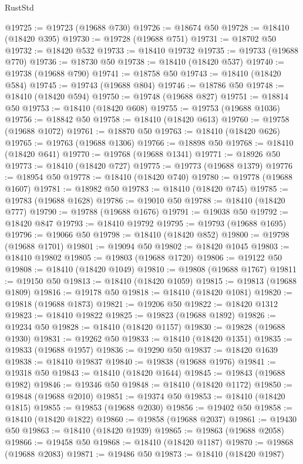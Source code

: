 \begin{lexlean}{RustStd}
\begin{coremodule}
@19725 := @19723 (@19688 @730)
@19726 := @18674 @50
@19728 := @18410 (@18420 @395)
@19730 := @19728 (@19688 @751)
@19731 := @18702 @50
@19732 := @18420 @532
@19733 := @18410 @19732
@19735 := @19733 (@19688 @770)
@19736 := @18730 @50
@19738 := @18410 (@18420 @537)
@19740 := @19738 (@19688 @790)
@19741 := @18758 @50
@19743 := @18410 (@18420 @584)
@19745 := @19743 (@19688 @804)
@19746 := @18786 @50
@19748 := @18410 (@18420 @594)
@19750 := @19748 (@19688 @827)
@19751 := @18814 @50
@19753 := @18410 (@18420 @608)
@19755 := @19753 (@19688 @1036)
@19756 := @18842 @50
@19758 := @18410 (@18420 @613)
@19760 := @19758 (@19688 @1072)
@19761 := @18870 @50
@19763 := @18410 (@18420 @626)
@19765 := @19763 (@19688 @1306)
@19766 := @18898 @50
@19768 := @18410 (@18420 @641)
@19770 := @19768 (@19688 @1341)
@19771 := @18926 @50
@19773 := @18410 (@18420 @727)
@19775 := @19773 (@19688 @1379)
@19776 := @18954 @50
@19778 := @18410 (@18420 @740)
@19780 := @19778 (@19688 @1607)
@19781 := @18982 @50
@19783 := @18410 (@18420 @745)
@19785 := @19783 (@19688 @1628)
@19786 := @19010 @50
@19788 := @18410 (@18420 @777)
@19790 := @19788 (@19688 @1676)
@19791 := @19038 @50
@19792 := @18420 @847
@19793 := @18410 @19792
@19795 := @19793 (@19688 @1695)
@19796 := @19066 @50
@19798 := @18410 (@18420 @852)
@19800 := @19798 (@19688 @1701)
@19801 := @19094 @50
@19802 := @18420 @1045
@19803 := @18410 @19802
@19805 := @19803 (@19688 @1720)
@19806 := @19122 @50
@19808 := @18410 (@18420 @1049)
@19810 := @19808 (@19688 @1767)
@19811 := @19150 @50
@19813 := @18410 (@18420 @1059)
@19815 := @19813 (@19688 @1809)
@19816 := @19178 @50
@19818 := @18410 (@18420 @1081)
@19820 := @19818 (@19688 @1873)
@19821 := @19206 @50
@19822 := @18420 @1312
@19823 := @18410 @19822
@19825 := @19823 (@19688 @1892)
@19826 := @19234 @50
@19828 := @18410 (@18420 @1157)
@19830 := @19828 (@19688 @1930)
@19831 := @19262 @50
@19833 := @18410 (@18420 @1351)
@19835 := @19833 (@19688 @1957)
@19836 := @19290 @50
@19837 := @18420 @1639
@19838 := @18410 @19837
@19840 := @19838 (@19688 @1976)
@19841 := @19318 @50
@19843 := @18410 (@18420 @1644)
@19845 := @19843 (@19688 @1982)
@19846 := @19346 @50
@19848 := @18410 (@18420 @1172)
@19850 := @19848 (@19688 @2010)
@19851 := @19374 @50
@19853 := @18410 (@18420 @1815)
@19855 := @19853 (@19688 @2030)
@19856 := @19402 @50
@19858 := @18410 (@18420 @1822)
@19860 := @19858 (@19688 @2037)
@19861 := @19430 @50
@19863 := @18410 (@18420 @1939)
@19865 := @19863 (@19688 @2058)
@19866 := @19458 @50
@19868 := @18410 (@18420 @1187)
@19870 := @19868 (@19688 @2083)
@19871 := @19486 @50
@19873 := @18410 (@18420 @1987)

\end{coremodule}
\end{lexlean}
